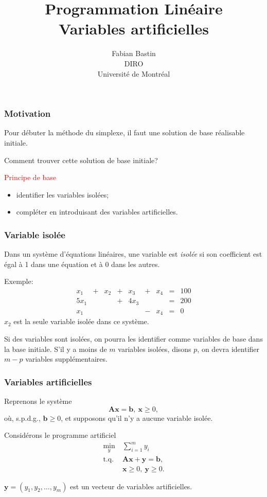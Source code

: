 \documentclass[usepdftitle=false]{beamer}
\title[Variables artificielles]{Programmation Linéaire\\Variables artificielles}
\author[Fabian Bastin]{Fabian Bastin\\DIRO\\Université de Montréal}
\date{}
\def\bb{\boldsymbol{b}}
\def\bx{\boldsymbol{x}}
\def\by{\boldsymbol{y}}
\def\bA{\boldsymbol{A}}
\begin{document}
\frame{\titlepage}


\begin{frame}
\frametitle{Motivation}

Pour débuter la méthode du simplexe, il faut une solution de base réalisable initiale.

\mbox{}

Comment trouver cette solution de base initiale?

\mbox{}

\textcolor{red}{Principe de base}
\begin{itemize}
	\item
	identifier les variables isolées;
	\item
compléter en introduisant des variables artificielles.
\end{itemize}

\end{frame}

\begin{frame}
\frametitle{Variable isolée}

Dans un système d'équations linéaires, une variable est {\em isolée} si son coefficient est égal à 1 dans une équation et à 0 dans les autres.

\mbox{}

Exemple:
$$
\begin{matrix}
x_1 & + & x_2 & + & x_3 & + &  x_4 & = & 100 \\
5x_1 & & & + & 4x_3 & & & = & 200 \\
x_1 & & & & & -  & x_4 & = & 0
\end{matrix}
$$
$x_2$ est la seule variable isolée dans ce système.

\mbox{}

Si des variables sont isolées, on pourra les identifier comme variables de base dans la base initiale. S'il y a moins de $m$ variables isolées, disons $p$, on devra identifier $m-p$ variables supplémentaires.
\end{frame}

\begin{frame}
\frametitle{Variables artificielles}

Reprenons le système
\[
\bA\bx = \bb, \ \bx \geq 0,
\]
où, s.p.d.g., $\bb \geq 0$, et supposons qu'il n'y a aucune variable isolée.

\mbox{}

Considérons le programme artificiel
\begin{align*}
\min_y \ & \sum_{i = 1}^m y_i\\
\mbox{t.q. } & \bA\bx + \by = \bb,\\
& \bx \geq 0, \ \by \geq 0.
\end{align*}

$\by = (y_1, y_2,\ldots, y_m)$ est un vecteur de variables artificielles.

\end{frame}
\end{document}
